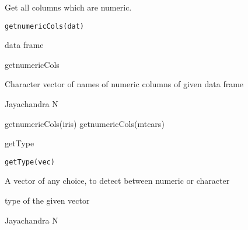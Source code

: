 \documentclass[a4paper]{book}
\begin{document}
%
\begin{Description}\relax
Get all columns which are numeric.
\end{Description}
%
\begin{Usage}
\begin{verbatim}
getnumericCols(dat)
\end{verbatim}
\end{Usage}
%
\begin{Arguments}
\begin{ldescription}
\item[\code{dat}] data frame
\end{ldescription}
\end{Arguments}
%
\begin{Details}\relax
getnumericCols
\end{Details}
%
\begin{Value}
Character vector of names of numeric columns of given data frame
\end{Value}
%
\begin{Author}\relax
Jayachandra N
\end{Author}
%
\begin{Examples}
\begin{ExampleCode}
getnumericCols(iris)
getnumericCols(mtcars)
\end{ExampleCode}
\end{Examples}
%
\begin{Description}\relax
getType
\end{Description}
%
\begin{Usage}
\begin{verbatim}
getType(vec)
\end{verbatim}
\end{Usage}
%
\begin{Arguments}
\begin{ldescription}
\item[\code{vec}] A vector of any choice, to detect between numeric or character
\end{ldescription}
\end{Arguments}
%
\begin{Value}
type of the given vector
\end{Value}
%
\begin{Author}\relax
Jayachandra N
\end{Author}
%
\begin{Examples}
\end{Examples}
\end{document}
